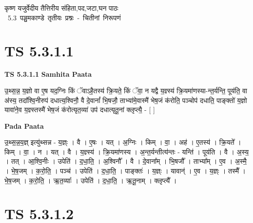 \documentclass[17pt]{extarticle}
\begin{document}
\begin{titlepage}
    \begin{center}
 
\begin{sanskrit}
    { \Large
    कृष्ण यजुर्वेदीय तैत्तिरीय संहिता,पद,जटा,घन पाठः 
    }
    \\
    \vspace{2.5cm}
    \mbox{ \Large
    5.3      पञ्चमकाण्डे तृतीयः प्रश्नः - चितीनां निरूपणं   }
\end{sanskrit}
\end{center}

\end{titlepage}
\tableofcontents
{}
\pagebreak


\section{ TS 5.3.1.1 }

\textbf{TS 5.3.1.1 } \newline
\textbf{Samhita Paata} \newline

उ॒थ्स॒न्न॒ य॒ज्ञो वा ए॒ष यद॒ग्निः किं ॅवाऽहै॒तस्य॑ क्रि॒यते॒ किं ॅवा॒ न यद्वै य॒ज्ञ्स्य॑ क्रि॒यमा॑णस्या-न्त॒र्यन्ति॒ पूय॑ति॒ वा अ॑स्य॒ तदा᳚श्वि॒नीरुप॑ दधात्य॒श्विनौ॒ वै दे॒वानां᳚ भि॒षजौ॒ ताभ्या॑मे॒वास्मै॑ भेष॒जं क॑रोति॒ पञ्चोप॑ दधाति॒ पाङ्क्तो॑ य॒ज्ञो यावा॑ने॒व य॒ज्ञ्स्तस्मै॑ भेष॒जं क॑रोत्यृत॒व्या॑ उप॑ दधात्यृतू॒नां क्लृप्त्यै॒ - [  ] \newline

\textbf{Pada Paata} \newline

उ॒थ्स॒न्न॒य॒ज्ञ् इत्यु॑थ्सन्न - य॒ज्ञ्ः । वै । ए॒षः । यत् । अ॒ग्निः । किम् । वा॒ । अह॑ । ए॒तस्य॑ । क्रि॒यते᳚ । किम् । वा॒ । न । यत् । वै । य॒ज्ञ्स्य॑ । क्रि॒यमा॑णस्य । अ॒न्त॒र्यन्तीत्य॑न्तः - यन्ति॑ । पूय॑ति । वै । अ॒स्य॒ । तत् । आ॒श्वि॒नीः । उपेति॑ । द॒धा॒ति॒ । अ॒श्विनौ᳚ । वै । दे॒वाना᳚म् । भि॒षजौ᳚ । ताभ्या᳚म् । ए॒व । अ॒स्मै॒ । भे॒ष॒जम् । क॒रो॒ति॒ । पञ्च॑ । उपेति॑ । द॒धा॒ति॒ । पाङ्क्तः॑ । य॒ज्ञ्ः । यावान्॑ । ए॒व । य॒ज्ञ्ः । तस्मै᳚ । भे॒ष॒जम् । क॒रो॒ति॒ । ऋ॒त॒व्याः᳚ । उपेति॑ । द॒धा॒ति॒ । ऋ॒तू॒नाम् । क्लृप्त्यै᳚ ।  \newline





\section{ TS 5.3.1.2 }
\end{document}
